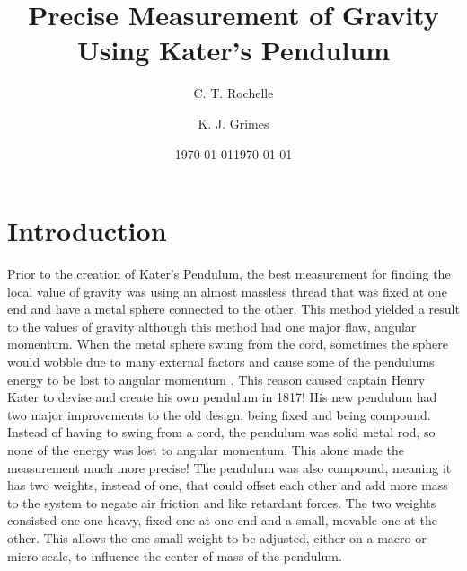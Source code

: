 \documentclass[aps,prl,10pt,twocolumn,floatfix]{revtex4-2}
\begin{document}
\begin{abstract}
\end{abstract}


\title{Precise Measurement of Gravity Using Kater's Pendulum}
\author{C. T. Rochelle}
\author{K. J. Grimes}
\date{\today}
\date{\today}

\maketitle

\section{Introduction}\label{Intro}
Prior to the creation of Kater's Pendulum, the best measurement for finding the local value of gravity was using an almost massless thread that was fixed at one end and have a metal sphere connected to the other. 
This method yielded a result to the values of gravity although this method had one major flaw, angular momentum.
When the metal sphere swung from the cord, sometimes the sphere would wobble due to many external factors and cause some of the pendulums energy to be lost to angular momentum \cite{BeforeKater}. 
This reason caused captain Henry Kater to devise and create his own pendulum in 1817\cite{KatersWork}!
His new pendulum had two major improvements to the old design, being fixed and being compound. 
Instead of having to swing from a cord, the pendulum was solid metal rod, so none of the energy was lost to angular momentum. 
This alone made the measurement much more precise!
The pendulum was also compound, meaning it has two weights, instead of one, that could offset each other and add more mass to the system to negate air friction and like retardant forces. 
The two weights consisted one one heavy, fixed one at one end and a small, movable one at the other. 
This allows the one small weight to be adjusted, either on a macro or micro scale, to influence the center of mass of the pendulum.  
\end{document}
